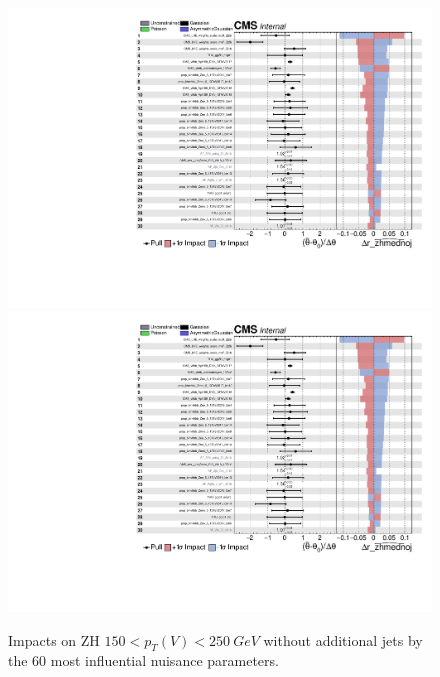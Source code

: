 \begin{figure}
  \centering
  \includegraphics[width=0.85\linewidth,page=1]{figures/impacts/impacts_r_zhmednoj.pdf}
  \includegraphics[width=0.85\linewidth,page=2]{figures/impacts/impacts_r_zhmednoj.pdf}
  \caption[Impacts for ZH $150 < p_T(V) < \SI{250}{GeV}$ without jets]{
    Impacts on ZH $150 < p_T(V) < \SI{250}{GeV}$ without additional jets
    by the 60 most influential nuisance parameters.
  }
  \label{fig:impacts_r_zhmednoj}
\end{figure}

